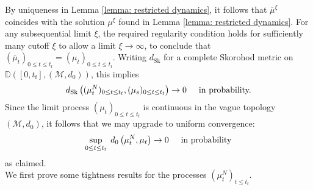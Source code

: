 By uniqueness in Lemma \ref{lemma: restricted dynamics}, it follows that $\overline{\mu}^\xi$ coincides with the solution $\mu^\xi$ found in Lemma \ref{lemma: restricted dynamics}. For any subsequential limit $\xi$, the required regularity condition holds for sufficiently many cutoff $\xi$ to allow a limit $\xi \rightarrow \infty$, to conclude that $(\overline{\mu}_t)_{0\le t\le t_\mathrm{f}}=(\mu_t)_{0\le t\le t_\mathrm{f}}$. Writing $d_\mathrm{Sk}$ for a complete Skorohod metric on $\mathbb{D}([0,t_\mathrm{f}],(\mathcal{M},d_0))$, this implies \begin{equation} d_\mathrm{Sk}\left((\mu^N_t)_{0\le t\le t_\mathrm{f}}, (\mu_s)_{0\le t\le t_\mathrm{f}}\right) \rightarrow 0 \hspace{0.5cm} \text{in probability.} \end{equation} Since the limit process $(\mu_t)_{0\le t\le t_\mathrm{f}}$ is continuous in the vague topology $(\mathcal{M},d_0)$, it follows that we may upgrade to uniform convergence: \begin{equation} \sup_{0\le t\le t_\mathrm{f}}\hspace{0.1cm}d_0\left(\mu^N_t, \mu_t\right) \rightarrow 0 \hspace{0.5cm} \text{in probability}  \end{equation} as claimed. \medskip \\ We first prove some tightness results for the processes $(\mu^N_t)_{t\le t_\mathrm{f}}.$ 

